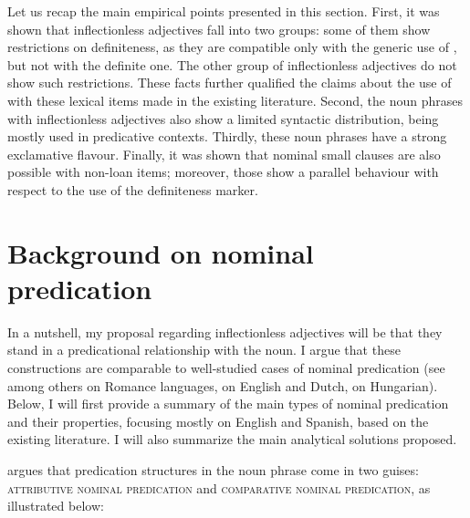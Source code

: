 \documentclass[output=paper]{langscibook}
\begin{document}
\noindent Let us recap the main empirical points presented in this section. First, it was shown that inflectionless adjectives fall into two groups: some of them show restrictions on definiteness, as they are compatible only with the generic use of \Def{}, but not with the definite one. The other group of inflectionless adjectives do not show such restrictions. These facts further qualified the claims about the use of \Def{} with these lexical items made in the existing literature. 
Second, the noun phrases with inflectionless adjectives also show a limited syntactic distribution, being mostly used in predicative contexts. Thirdly, these noun phrases have a strong exclamative flavour. Finally, it was shown that nominal small clauses are also possible with non-loan items; moreover, those show a parallel behaviour with respect to the use of the definiteness marker.



\section{Background on nominal predication}\label{ge-sec-theorbackgr}

In a nutshell, my proposal regarding inflectionless adjectives will be that they stand in a predicational relationship with the noun. I argue that these constructions are comparable to well-studied cases of nominal predication (see \citealt{Napoli1989,HulkTellier2000,DoetjesRooryck2003,Casillas2003,VillalbaBartra-Kaufman2010} among others on Romance languages, \citealt{denDikken2006} on English and Dutch, \citealt{denDikkenLiptak1997} on Hungarian). Below, I will first provide a summary of the main types of nominal predication and their properties, focusing mostly on English and Spanish, based on the existing literature. I will also summarize the main analytical solutions proposed. %



 argues that predication structures in the noun phrase come in two guises: \textsc{attributive nominal predication} and \textsc{comparative nominal predication}, as illustrated below:
\end{document}
